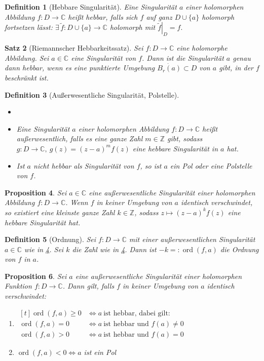 \documentclass[a4paper,12pt]{article}
\theoremstyle{newthm}
\newtheorem{thm}{Satz}[subsection]
\newtheorem{prop}[thm]{Proposition}
\theoremstyle{newdef}
\newtheorem{defn}[thm]{Definition}
\theoremstyle{newrem}
\newcommand{\Z}{\mathbb{Z}}
\newcommand{\C}{\mathbb{C}}
\newcommand{\ord}[2]{\operatorname{ord} \left( #1,#2 \right)}
\newcommand{\bound}[2]{\left.#1\right|_{#2}}
\begin{document}
		\begin{defn}[Hebbare Singularität]
			Eine Singularität $a$ einer holomorphen Abbildung $f: D \to \C$ heißt \emph{hebbar}, falls sich $f$ auf ganz $D \cup \{a\}$ holomorph fortsetzen lässt: $ \exists\, \tilde{f}: D \cup \{a\} \to \C $ holomorph mit $ \bound{\tilde{f}}{D} = f. $
		\end{defn}
		
		\begin{thm}[Riemannscher Hebbarkeitssatz]
			Sei $ f: D \to \C $ eine holomorphe Abbildung. Sei $a \in \C$ eine Singularität von $f$. Dann ist die Singularität $a$ genau dann hebbar, wenn es eine punktierte Umgebung $ \dot{B_r(a)} \subset D $ von $a$ gibt, in der $f$ beschränkt ist.
		\end{thm}
		
		\begin{defn}[Außerwesentliche Singularität, Polstelle]
			\begin{itemize}
				\item[]
				\item Eine Singularität $a$ einer holomorphen Abbildung $ f: D \to \C $ heißt \emph{außerwesentlich}, falls es eine ganze Zahl $m \in \Z$ gibt, sodass $ g: D \to \C,\ g(z) = (z-a)^mf(z) $ eine hebbare Singularität in $a$ hat.
				\item Ist $a$ nicht hebbar als Singularität von $f$, so ist $a$ ein \emph{Pol} oder eine \emph{Polstelle} von $f$.
			\end{itemize}
		\end{defn}
		
		\begin{prop}\label{3.1.5}
			Sei $a \in \C$ eine außerwesentliche Singularität einer holomorphen Abbildung $ f: D \to \C $. Wenn $f$ in keiner Umgebung von $a$ identisch verschwindet, so existiert eine kleinste ganze Zahl $k \in \Z$, sodass $ z \mapsto (z-a)^kf(z) $ eine hebbare Singularität hat.
		\end{prop}
		
		\begin{defn}[Ordnung]
			Sei $ f: D \to \C $ mit einer außerwesentlichen Singularität $ a \in \C $ wie in \ref{3.1.5}. Sei $k$ die Zahl wie in \ref{3.1.5}. Dann ist $ -k =: \ord{f}{a} $ die Ordnung von $f$ in $a$.
		\end{defn}
		
		\begin{prop}
			Sei $a$ eine außerwesentliche Singularität einer holomorphen Funktion $f: D \to \C$. Dann gilt, falls $f$ in keiner Umgebung von $a$ identisch verschwindet:
			\begin{enumerate}[label={\roman*})]
				\item $\begin{aligned}[t]
					\ord{f}{a} \geq 0 &\iff a\ \text{ist hebbar, dabei gilt:}\\
					\ord{f}{a} = 0 &\iff a\ \text{ist hebbar und } f(a) \neq 0\\
					\ord{f}{a} > 0 &\iff a\ \text{ist hebbar und } f(a) = 0
				\end{aligned}$
				\item $ \ord{f}{a} < 0 \iff a $ ist ein Pol
			\end{enumerate}
		\end{prop}
		
\end{document}
